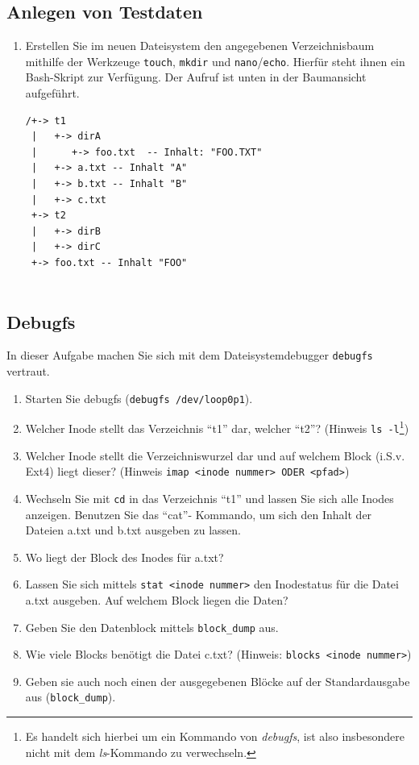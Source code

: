\documentclass[11pt,a4paper]{article}
\def\inlinebash{\lstinline[style=bash]}
\begin{document}
\subsection{Anlegen von Testdaten}

\begin{enumerate}
\item Erstellen Sie im neuen Dateisystem den angegebenen Verzeichnisbaum 
	mithilfe der Werkzeuge \inlinebash$touch$, \inlinebash$mkdir$ und 
	\inlinebash$nano$\slash\inlinebash$echo$. Hierfür steht ihnen ein Bash-Skript 
	zur Verfügung. Der Aufruf ist unten in der Baumansicht aufgeführt.

\begin{verbatim}
/+-> t1
 |   +-> dirA
 |      +-> foo.txt  -- Inhalt: "FOO.TXT"
 |   +-> a.txt -- Inhalt "A"
 |   +-> b.txt -- Inhalt "B" 
 |   +-> c.txt 
 +-> t2
 |   +-> dirB
 |   +-> dirC
 +-> foo.txt -- Inhalt "FOO"
 
\end{verbatim}
\end{enumerate}

\subsection{Debugfs}
In dieser Aufgabe machen Sie sich mit dem Dateisystemdebugger
\inlinebash$debugfs$ vertraut.

\begin{enumerate}
	\item Starten Sie debugfs (\inlinebash$debugfs /dev/loop0p1$).
	\item Welcher Inode stellt das Verzeichnis ``t1'' dar, welcher ``t2''?
		(Hinweis \inlinebash$ls -l$\footnote{
			Es handelt sich hierbei um ein Kommando von \emph{debugfs}, ist also
			insbesondere nicht mit dem \emph{ls}-Kommando zu verwechseln.})
	\item Welcher Inode stellt die Verzeichniswurzel dar und
		auf welchem Block (i.S.v. Ext4) liegt dieser?
		(Hinweis \inlinebash$imap <inode nummer> ODER <pfad>$)
	\item Wechseln Sie mit \inlinebash$cd$ in das Verzeichnis ``t1'' und lassen
		Sie sich alle Inodes anzeigen. Benutzen Sie das ``cat''-
		Kommando, um sich den Inhalt der Dateien a.txt und b.txt
		ausgeben zu lassen.
	\item Wo liegt der Block des Inodes für a.txt?
	\item Lassen Sie sich mittels \inlinebash$stat <inode nummer>$ den
		Inodestatus für die Datei a.txt ausgeben.
		Auf welchem Block liegen die Daten?
	\item Geben Sie den Datenblock mittels \inlinebash$block_dump$ aus.
	\item Wie viele Blocks benötigt die Datei c.txt?
		(Hinweis: \inlinebash$blocks <inode nummer>$)
	\item Geben sie auch noch einen der ausgegebenen Blöcke
		auf der Standardausgabe aus (\inlinebash$block_dump$).
\end{enumerate}
\end{document}
